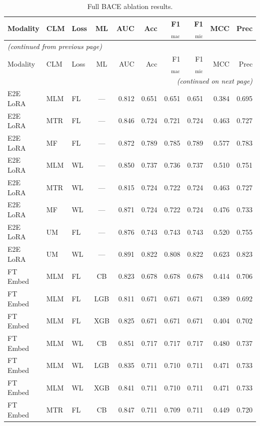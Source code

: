 \documentclass[9pt,a4paper]{article}
\begin{document}
\begin{scriptsize}
\begin{longtable}{lllcrrrrrr}
\caption{Full BACE ablation results.}
\label{tab:s5_bace} \\
\toprule
Modality & CLM & Loss & ML & AUC & Acc & F1$_\text{mac}$ & F1$_\text{mic}$ & MCC & Prec \\
\midrule
\endfirsthead
\multicolumn{10}{l}{\footnotesize\textit{(continued from previous page)}} \\
\toprule
Modality & CLM & Loss & ML & AUC & Acc & F1$_\text{mac}$ & F1$_\text{mic}$ & MCC & Prec \\
\midrule
\endhead
\midrule
\multicolumn{10}{r}{\footnotesize\textit{(continued on next page)}} \\
\endfoot
\bottomrule
\endlastfoot
E2E LoRA & MLM & FL & --- & 0.812 & 0.651 & 0.651 & 0.651 & 0.384 & 0.695 \\
E2E LoRA & MTR & FL & --- & 0.846 & 0.724 & 0.721 & 0.724 & 0.463 & 0.727 \\
E2E LoRA & MF  & FL & --- & 0.872 & 0.789 & 0.785 & 0.789 & 0.577 & 0.783 \\
E2E LoRA & MLM & WL & --- & 0.850 & 0.737 & 0.736 & 0.737 & 0.510 & 0.751 \\
E2E LoRA & MTR & WL & --- & 0.815 & 0.724 & 0.722 & 0.724 & 0.463 & 0.727 \\
E2E LoRA & MF  & WL & --- & 0.871 & 0.724 & 0.722 & 0.724 & 0.476 & 0.733 \\
E2E LoRA & UM  & FL & --- & 0.876 & 0.743 & 0.743 & 0.743 & 0.520 & 0.755 \\
E2E LoRA & UM  & WL & --- & 0.891 & 0.822 & 0.808 & 0.822 & 0.623 & 0.823 \\
\midrule
FT Embed & MLM & FL & CB  & 0.823 & 0.678 & 0.678 & 0.678 & 0.414 & 0.706 \\
FT Embed & MLM & FL & LGB & 0.811 & 0.671 & 0.671 & 0.671 & 0.389 & 0.692 \\
FT Embed & MLM & FL & XGB & 0.825 & 0.671 & 0.671 & 0.671 & 0.404 & 0.702 \\
FT Embed & MLM & WL & CB  & 0.851 & 0.717 & 0.717 & 0.717 & 0.480 & 0.737 \\
FT Embed & MLM & WL & LGB & 0.835 & 0.711 & 0.710 & 0.711 & 0.471 & 0.733 \\
FT Embed & MLM & WL & XGB & 0.841 & 0.711 & 0.710 & 0.711 & 0.471 & 0.733 \\
FT Embed & MTR & FL & CB  & 0.847 & 0.711 & 0.709 & 0.711 & 0.449 & 0.720 \\

\end{longtable}
\end{scriptsize}
\end{document}
